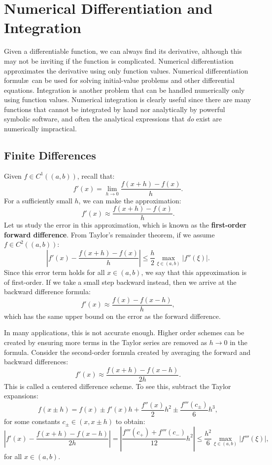\chapter{Numerical Differentiation and Integration}\label{chapter:Calculus}

Given a differentiable function, we can always find its derivative, although this may not be inviting if the function is complicated. Numerical differentiation approximates the derivative using only function values. Numerical differentiation formul\ae~can be used for solving initial-value problems and other differential equations. Integration is another problem that can be handled numerically only using function values. Numerical integration is clearly useful since there are many functions that cannot be integrated by hand nor analytically by powerful symbolic software, and often the analytical expressions that {\em do} exist are numerically impractical.

\section{Finite Differences}

Given $f\in C^1((a,b))$, recall that:
\[
f'(x) = \lim_{h\to0}\dfrac{f(x+h)-f(x)}{h}.
\]
For a sufficiently small $h$, we can make the approximation:
\[
f'(x) \approx \dfrac{f(x+h)-f(x)}{h}.
\]
Let us study the error in this approximation, which is known as the {\bf first-order forward difference}. From Taylor's remainder theorem, if we assume $f\in C^2((a,b))$:
\[
\left|f'(x) - \dfrac{f(x+h)-f(x)}{h}\right| \le \dfrac{h}{2}\max_{\xi\in(a,b)}|f''(\xi)|.
\]
Since this error term holds for all $x\in(a,b)$, we say that this approximation is of first-order. If we take a small step backward instead, then we arrive at the backward difference formula:
\[
f'(x) \approx \dfrac{f(x)-f(x-h)}{h},
\]
which has the same upper bound on the error as the forward difference.

In many applications, this is not accurate enough. Higher order schemes can be created by ensuring more terms in the Taylor series are removed as $h\to0$ in the formula. Consider the second-order formula created by averaging the forward and backward differences:
\[
f'(x) \approx \dfrac{f(x+h)-f(x-h)}{2h}.
\]
This is called a centered difference scheme. To see this, subtract the Taylor expansions:
\[
f(x\pm h) = f(x) \pm f'(x)h + \dfrac{f''(x)}{2}h^2 \pm \dfrac{f'''(c_\pm)}{6}h^3,
\]
for some constants $c_\pm\in(x,x\pm h)$ to obtain:
\[
\left|f'(x) - \dfrac{f(x+h)-f(x-h)}{2h}\right| = \left|\dfrac{f'''(c_+) + f'''(c_-)}{12}h^2\right| \le \dfrac{h^2}{6}\max_{\xi\in(a,b)}|f'''(\xi)|,
\]
for all $x\in(a,b)$.

